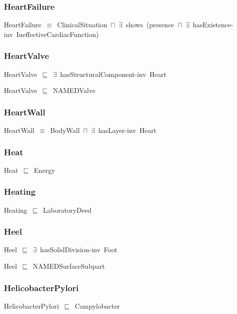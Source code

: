 \documentclass{article}
\begin{document}
\subsubsection*{HeartFailure}

HeartFailure~\ensuremath{\equiv}~ClinicalSituation~\ensuremath{\sqcap}~\ensuremath{\exists}~shows~(presence~\ensuremath{\sqcap}~\ensuremath{\exists}~hasExistence-inv~IneffectiveCardiacFunction)

\subsubsection*{HeartValve}

HeartValve~\ensuremath{\sqsubseteq}~\ensuremath{\exists}~hasStructuralComponent-inv~Heart~

HeartValve~\ensuremath{\sqsubseteq}~NAMEDValve~

\subsubsection*{HeartWall}

HeartWall~\ensuremath{\equiv}~BodyWall~\ensuremath{\sqcap}~\ensuremath{\exists}~hasLayer-inv~Heart

\subsubsection*{Heat}

Heat~\ensuremath{\sqsubseteq}~Energy~

\subsubsection*{Heating}

Heating~\ensuremath{\sqsubseteq}~LaboratoryDeed~

\subsubsection*{Heel}

Heel~\ensuremath{\sqsubseteq}~\ensuremath{\exists}~hasSolidDivision-inv~Foot~

Heel~\ensuremath{\sqsubseteq}~NAMEDSurfaceSubpart~

\subsubsection*{HelicobacterPylori}

HelicobacterPylori~\ensuremath{\sqsubseteq}~Campylobacter~
\end{document}
